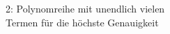 \documentclass[preview]{standalone}
\begin{document}
\begin{center}
2: Polynomreihe mit unendlich vielen\\Termen für die höchste Genauigkeit
\end{center}
\end{document}
